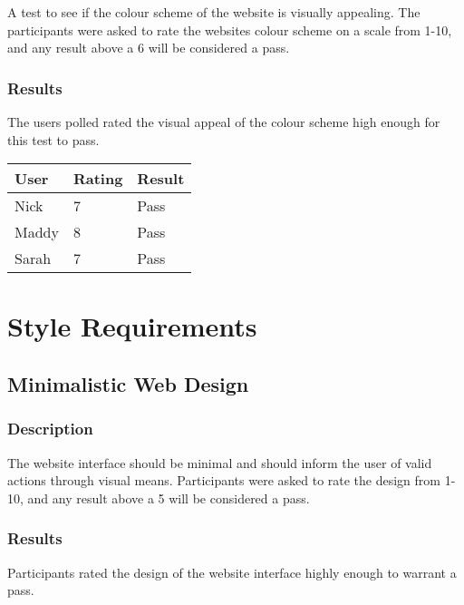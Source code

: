 \documentclass{scrreprt}
\begin{document}
A test to see if the colour scheme of the website is visually appealing. The
participants were asked to rate the websites colour scheme on a scale from
1-10, and any result above a 6 will be considered a pass.

\subsubsection{Results}

The users polled rated the visual appeal of the colour scheme high enough for
this test to pass.

\begin{table}[H]
        \centering
        \begin{tabular}{||p{2.5cm}|p{2.5cm}|p{2.5cm}||}
                \hline
                \textbf User & \textbf Rating & \textbf Result\\
                \hline\hline
                Nick & 7 & Pass \\
                \hline
                Maddy & 8 & Pass\\ %
                \hline
                Sarah & 7 & Pass \\
                \hline
        \end{tabular}
\end{table}

\section{Style Requirements}

\subsection{Minimalistic Web Design}
\subsubsection{Description}

The website interface should be minimal and should inform the user of valid
actions through visual means. Participants were asked to rate the design from
1-10, and any result above a 5 will be considered a pass.

\subsubsection{Results}

Participants rated the design of the website interface highly enough to warrant
a pass.
\end{document}
